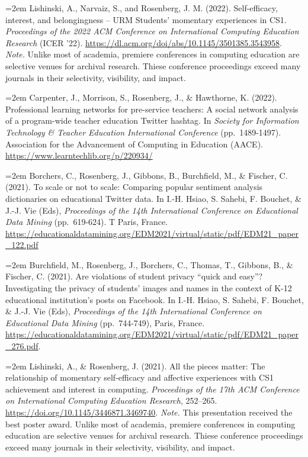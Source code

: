 \documentclass[
  14,
]{article}
\begin{document}
\hangindent=2em Lishinski, A., Narvaiz, S., and Rosenberg, J. M. (2022).
Self-efficacy, interest, and belongingness -- URM Students' momentary
experiences in CS1. \emph{Proceedings of the 2022 ACM Conference on
International Computing Education Research} (ICER '22).
\url{https://dl.acm.org/doi/abs/10.1145/3501385.3543958}. \emph{Note.}
Unlike most of academia, premiere conferences in computing education are
selective venues for archival research. Thiese conference proceedings
exceed many journals in their selectivity, visibility, and impact.

\hangindent=2em Carpenter, J., Morrison, S., Rosenberg, J., \&
Hawthorne, K. (2022). Professional learning networks for pre-service
teachers: A social network analysis of a program-wide teacher education
Twitter hashtag. In \emph{Society for Information Technology \& Teacher
Education International Conference} (pp.~1489-1497). Association for the
Advancement of Computing in Education (AACE).
\url{https://www.learntechlib.org/p/220934/}

\hangindent=2em Borchers, C., Rosenberg, J., Gibbons, B., Burchfield,
M., \& Fischer, C. (2021). To scale or not to scale: Comparing popular
sentiment analysis dictionaries on educational Twitter data. In I.-H.
Hsiao, S. Sahebi, F. Bouchet, \& J.-J. Vie (Eds), \emph{Proceedings of
the 14th International Conference on Educational Data Mining}
(pp.~619-624). T Paris, France.
\url{https://educationaldatamining.org/EDM2021/virtual/static/pdf/EDM21_paper_122.pdf}

\hangindent=2em Burchfield, M., Rosenberg, J., Borchers, C., Thomas, T.,
Gibbons, B., \& Fischer, C. (2021). Are violations of student privacy
``quick and easy''? Investigating the privacy of students' images and
names in the context of K-12 educational institution's posts on
Facebook. In I.-H. Hsiao, S. Sahebi, F. Bouchet, \& J.-J. Vie (Eds),
\emph{Proceedings of the 14th International Conference on Educational
Data Mining} (pp.~744-749), Paris, France.
\url{https://educationaldatamining.org/EDM2021/virtual/static/pdf/EDM21_paper_276.pdf}.

\hangindent=2em Lishinski, A., \& Rosenberg, J. (2021). All the pieces
matter: The relationship of momentary self-efficacy and affective
experiences with CS1 achievement and interest in computing.
\emph{Proceedings of the 17th ACM Conference on International Computing
Education Research}, 252--265.
\url{https://doi.org/10.1145/3446871.3469740}. \emph{Note.} This
presentation received the best poster award. Unlike most of academia,
premiere conferences in computing education are selective venues for
archival research. Thiese conference proceedings exceed many journals in
their selectivity, visibility, and impact.
\end{document}
